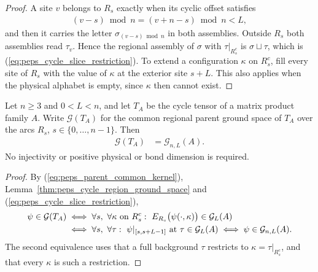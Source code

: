 \begin{proof}\leanok
    A site $v$ belongs to $R_s$ exactly when its cyclic offset
    satisfies
    \begin{align}
        (v-s)\bmod n=(v+n-s)\bmod n<L,
    \end{align}
    and then it carries the letter $\sigma_{(v-s)\bmod n}$ in both
    assemblies. Outside $R_s$ both assemblies read $\tau_v$. Hence
    the regional assembly of $\sigma$ with $\tau|_{R_s^c}$ is
    $\sigma\sqcup\tau$, which is
    (\ref{eq:peps_cycle_slice_restriction}). To extend a configuration
    $\kappa$ on $R_s^c$, fill every site of $R_s$ with the value of
    $\kappa$ at the exterior site $s+L$. This also applies when the
    physical alphabet is empty, since $\kappa$ then cannot exist.
\end{proof}

\begin{lemma}
    \label{thm:peps_cycle_parent_ground_space}
    \leanok
    Let $n\ge3$ and $0<L<n$, and let $T_A$ be the cycle tensor of a
    matrix product family $A$. Write $\mathcal G(T_A)$ for the common
    regional parent ground space of $T_A$ over the arcs
    $R_s$, $s\in\{0,\ldots,n-1\}$. Then
    \begin{align}
        \mathcal G(T_A) & =\mathcal G_{n,L}(A).
    \end{align}
    No injectivity or positive physical or bond dimension is required.
\end{lemma}

\begin{proof}\leanok
    By (\ref{eq:peps_parent_common_kernel}),
    Lemma~\ref{thm:peps_cycle_region_ground_space} and
    (\ref{eq:peps_cycle_slice_restriction}),
    \begin{align}
        \psi\in\mathcal G(T_A)
         & \iff\forall s,\ \forall\kappa\text{ on }R_s^c:\
        E_{R_s}\bigl(\psi(\cdot,\kappa)\bigr)\in\mathcal G_L(A)
        \notag                                             \\
         & \iff\forall s,\ \forall\tau:\
        \psi|_{[s,s+L-1]}\text{ at }\tau\in\mathcal G_L(A)
        \iff\psi\in\mathcal G_{n,L}(A).
        \notag
    \end{align}
    The second equivalence uses that a full background $\tau$
    restricts to $\kappa=\tau|_{R_s^c}$, and that every $\kappa$ is
    such a restriction.
\end{proof}

